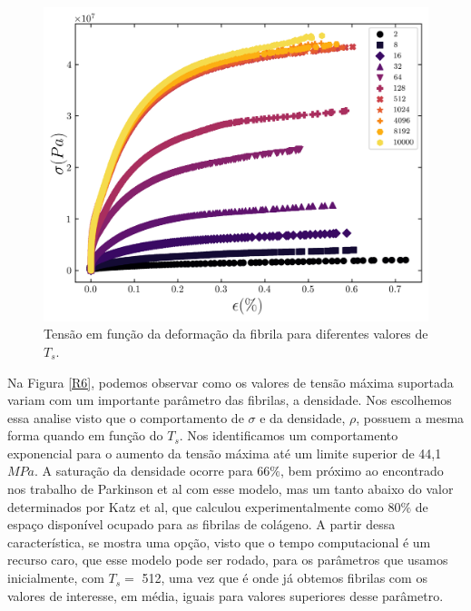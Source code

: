 \documentclass{article}
\begin{document}
\begin{figure}[H]
    \centering
    \includegraphics[width=\textwidth]{figures/stress_strain.png}

    \caption{Tensão em função da deformação da fibrila para diferentes valores de $T_{s}$.} 

    \label{R5}
\end{figure}

Na Figura \ref{R6}, podemos observar como os valores de tensão máxima suportada variam com um importante parâmetro das fibrilas, a densidade. 
Nos escolhemos essa analise visto que o comportamento de $\sigma$ e da densidade, $\rho$, possuem a mesma forma quando em função do $T_{s}$. Nos identificamos um comportamento exponencial para o aumento da tensão máxima até um limite superior de 44,1 $MPa$. 
A saturação da densidade ocorre para 66$\%$, bem próximo ao encontrado nos trabalho de Parkinson et al\cite{Parkinson1995} com esse modelo, mas um tanto abaixo do valor determinados por Katz et al\cite{KATZ1973351}, que calculou experimentalmente como 80$\%$ de espaço disponível ocupado para as fibrilas de colágeno. A partir dessa característica, se mostra uma opção, visto que o tempo computacional é um recurso caro, que esse modelo pode ser rodado, para os parâmetros que usamos inicialmente, com $T_{s}=$ 512, uma vez que é onde já obtemos fibrilas com os valores de interesse, em média, iguais para valores superiores desse parâmetro.
\end{document}
